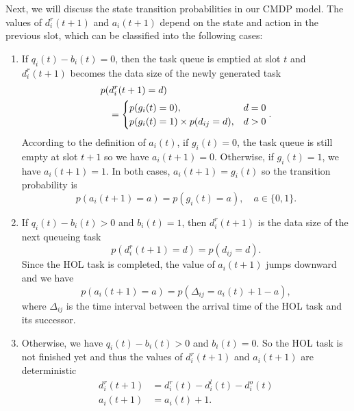 \documentclass[lettersize, journal]{IEEEtran}
\begin{document}
Next, we will discuss the state transition probabilities in our CMDP model.
The values of $d^r_i(t+1)$ and $a_i(t+1)$ depend on the state and action in the previous slot, which can be classified into 
the following cases:
\begin{enumerate}
    \item If $q_i(t) - b_i(t) = 0$, then the task queue is emptied at slot $t$
        and $d^r_i(t+1)$ becomes the data size of the newly generated task
        \begin{align}
            p(&d^r_i(t+1)=d) \notag \\
            &=
            \begin{cases}
                p(g_i(t) = 0), &\text{$d=0$}\\
                p(g_i(t) = 1) \times p(d_{ij} = d), &\text{$d>0$}
            \end{cases}.
            \label{eq:p_d_1}
        \end{align}
        According to the definition of $a_i(t)$, if $g_i(t) = 0$, the task queue is still empty at slot $t+1$
        so we have $a_i(t+1) = 0$.
        Otherwise, if $g_i(t) = 1$, we have $a_i(t+1) = 1$.
        In both cases, $a_i(t+1) = g_i(t)$ so the transition probability is
        \begin{equation}
            p(a_i(t+1) = a) = p(g_i(t) = a), \quad a\in \{0,1\}.
            \label{eq:p_a_1}
        \end{equation}
    \item If $q_i(t) - b_i(t) > 0$ and $b_i(t) = 1$, then $d^r_i(t+1)$ is the data size of the next queueing task
        \begin{equation}
            p(d^r_i(t+1)=d) = p(d_{ij} = d).
            \label{eq:p_d_2}
        \end{equation}
        Since the HOL task is completed, the value of $a_i(t+1)$ jumps downward and we have
        \begin{equation}
            p(a_i(t+1) = a) = p(\Delta_{ij} = a_i(t) + 1 - a),
            \label{eq:p_a_2}
        \end{equation}
        where $\Delta_{ij}$ is the time interval between the arrival time of the HOL task and its successor.
    \item Otherwise, we have $q_i(t) - b_i(t) > 0$ and $b_i(t) = 0$. So the HOL task is not finished yet and thus the values of $d^r_i(t+1)$
        and $a_i(t+1)$ are deterministic
        \begin{align}
            d^r_i(t+1) &= d^r_i(t) - d^l_i(t) - d^o_i(t) \label{eq:p_d_3} \\
            a_i(t+1) &= a_i(t) + 1. \label{eq:p_a_3}
        \end{align}
\end{enumerate}
\end{document}
